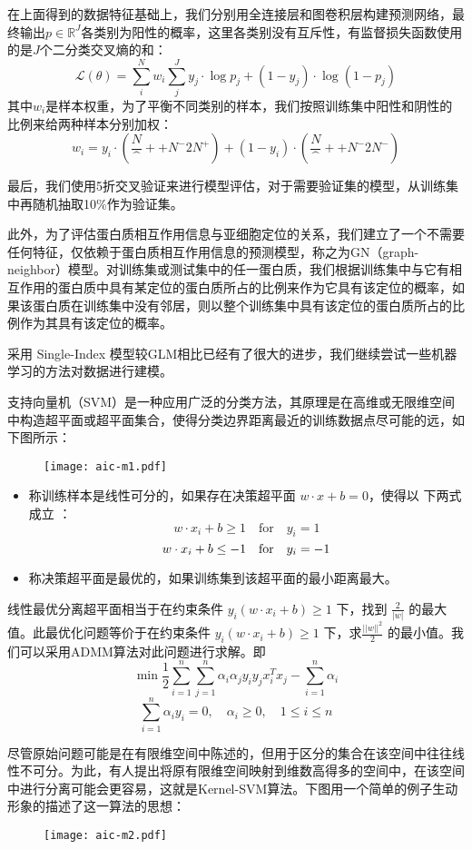 \documentclass[a4paper,UTF8]{article}
\begin{document}
在上面得到的数据特征基础上，我们分别用全连接层和图卷积层构建预测网络，最终输出$p \in \mathbb R^J$各类别为阳性的概率，这里各类别没有互斥性，有监督损失函数使用的是$J$个二分类交叉熵的和：
$$\mathcal L(\theta) = \sum_i^N w_i \sum_j^{J} y_j\cdot \log p_j + (1-y_j)\cdot \log (1-p_j) $$
其中$w_i$是样本权重，为了平衡不同类别的样本，我们按照训练集中阳性和阴性的比例来给两种样本分别加权：
$$w_i=y_i \cdot (\frac N^++N^- 2N^+) + (1-y_i) \cdot (\frac N^++N^- 2N^-)$$

最后，我们使用5折交叉验证来进行模型评估，对于需要验证集的模型，从训练集中再随机抽取10\%作为验证集。

此外，为了评估蛋白质相互作用信息与亚细胞定位的关系，我们建立了一个不需要任何特征，仅依赖于蛋白质相互作用信息的预测模型，称之为GN（graph-neighbor）模型。对训练集或测试集中的任一蛋白质，我们根据训练集中与它有相互作用的蛋白质中具有某定位的蛋白质所占的比例来作为它具有该定位的概率，如果该蛋白质在训练集中没有邻居，则以整个训练集中具有该定位的蛋白质所占的比例作为其具有该定位的概率。



采用 Single-Index 模型较GLM相比已经有了很大的进步，我们继续尝试一些机器学习的方法对数据进行建模。

支持向量机（SVM）是一种应用广泛的分类方法，其原理是在高维或无限维空间中构造超平面或超平面集合，使得分类边界距离最近的训练数据点尽可能的远，如下图所示：
\begin{figure}[H]
	\centering\texttt{[image: aic-m1.pdf]}
\end{figure}
\begin{itemize}
	\item 称训练样本是线性可分的，如果存在决策超平面 $w\cdot x+b=0 $，使得以
	下两式成立 ：
	$$w\cdot x_{i}+b\geq 1 \quad\text{for}\quad y_{i}=1 $$
	$$w\cdot x_{i}+b\leq -1 \quad\text{for\quad} y_{i}=-1 $$
	\item 称决策超平面是最优的，如果训练集到该超平面的最小距离最大。
\end{itemize}

线性最优分离超平面相当于在约束条件 $y_{i}(w\cdot x_{i}+b) \geq 1$ 下，找到 $\frac{2}{|w|}$ 的最大值。此最优化问题等价于在约束条件 $y_{i}(w\cdot x_{i}+b) \geq 1$ 下，求$ \frac{||w ||^{2}}{2}$	的最小值。我们可以采用ADMM算法对此问题进行求解。即
$$\min \frac{1}{2}  \sum_{i=1}^{n}\sum_{j=1}^{n} \alpha_{i}\alpha_{j}y_{i}y_{j}x_{i}^{T}x_{j} - \sum_{i=1}^{n}\alpha_{i}$$
$$\sum_{i=1}^{n}\alpha_{i}y_{i}=0,\quad \alpha_{i} \geq 0,\quad 1\leq i \leq n $$

尽管原始问题可能是在有限维空间中陈述的，但用于区分的集合在该空间中往往线性不可分。为此，有人提出将原有限维空间映射到维数高得多的空间中，在该空间中进行分离可能会更容易，这就是Kernel-SVM算法。下图用一个简单的例子生动形象的描述了这一算法的思想：
\begin{figure}[H]
	\centering\texttt{[image: aic-m2.pdf]}
\end{figure}
\end{document}
